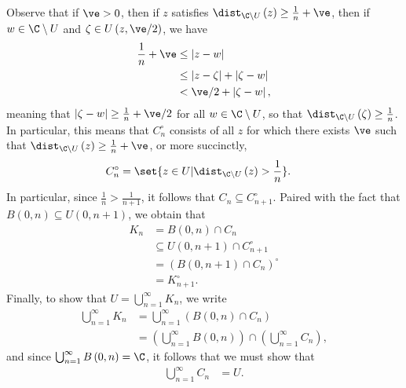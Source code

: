 \documentclass[10pt]{mypackage}
\begin{document}
\begin{solution}
\begin{enumerate}[(a)]
      Observe that if $\ve > 0$, then if $z$ satisfies $\dist_{\C\setminus U}\left( z \right) \geq \frac{1}{n} + \ve$, then if $w\in \C\setminus U$ and $\zeta\in U\left( z, \ve/2 \right)$, we have
      \begin{align*}
        \frac{1}{n} + \ve &\leq \left\vert z-w \right\vert\\
                          &\leq \left\vert z-\zeta \right\vert + \left\vert \zeta - w \right\vert\\
                          &< \ve/2 + \left\vert \zeta-w \right\vert,
      \end{align*}
      meaning that $\left\vert \zeta - w \right\vert \geq \frac{1}{n} + \ve/2$ for all $w\in \C\setminus U$, so that $\dist_{\C\setminus U}\left( \zeta \right) \geq \frac{1}{n}$. In particular, this means that $C_n^{\circ}$ consists of all $z$ for which there exists $\ve$ such that $\dist_{\C\setminus U}\left( z \right) \geq \frac{1}{n} + \ve$, or more succinctly,
      \begin{align*}
        C_n^{\circ} &= \set{z\in U | \dist_{\C\setminus U}\left( z \right) > \frac{1}{n}}.
      \end{align*}
      In particular, since $ \frac{1}{n} > \frac{1}{n + 1} $, it follows that $C_n\subseteq C_{n+1}^{\circ}$. Paired with the fact that $B\left( 0,n \right)\subseteq U\left( 0,n+1 \right)$, we obtain that
      \begin{align*}
        K_n &= B\left( 0,n \right) \cap C_n\\
            &\subseteq U\left( 0,n+1 \right)\cap C_{n+1}^{\circ}\\
            &= \left( B\left( 0,n+1 \right)\cap C_n \right)^{\circ}\\
            &= K_{n+1}^{\circ}.
      \end{align*}
      Finally, to show that $U = \bigcup_{n = 1}^{\infty}K_n$, we write
      \begin{align*}
        \bigcup_{n= 1}^{\infty}K_n &= \bigcup_{n = 1} ^{\infty} \left( B\left( 0,n \right) \cap C_n \right)\\
                                   &= \left( \bigcup_{n=1}^{\infty}B\left( 0,n \right) \right)\cap \left( \bigcup_{n=1}^{\infty} C_n \right),
      \end{align*}
      and since $\bigcup_{n=1}^{\infty}B\left( 0,n \right) = \C$, it follows that we must show that
      \begin{align*}
        \bigcup_{n=1}^{\infty}C_n &= U.
      \end{align*}

\end{enumerate}
\end{solution}
\end{document}
